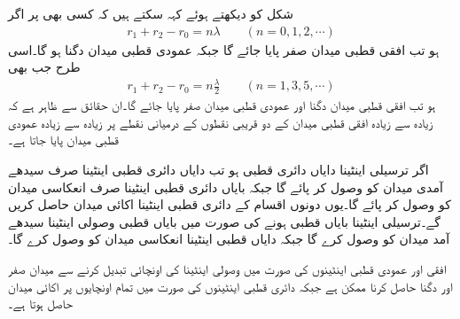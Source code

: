 شکل کو دیکھتے ہوئے کہہ سکتے ہیں کہ کسی بھی   پر اگر
\begin{align}
r_1+r_2-r_0=n\lambda \quad \quad (n=0,1,2,\cdots)
\end{align}
ہو تب افقی قطبی میدان صفر پایا جائے گا جبکہ عمودی قطبی میدان دگنا ہو گا۔اسی طرح جب بھی
\begin{align}
r_1+r_2-r_0=n \frac{\lambda}{2} \quad \quad (n=1,3,5,\cdots)
\end{align}
ہو تب افقی قطبی میدان دگنا اور عمودی قطبی میدان صفر پایا جائے گا۔ان حقائق سے ظاہر ہے کہ زیادہ سے زیادہ افقی قطبی میدان کے دو قریبی نقطوں کے درمیانی نقطے پر زیادہ سے زیادہ عمودی قطبی میدان پایا جاتا ہے۔

اگر ترسیلی اینٹینا دایاں دائری قطبی ہو تب دایاں دائری قطبی اینٹینا صرف سیدھے آمدی میدان کو وصول کر پائے گا جبکہ بایاں دائری قطبی اینٹینا صرف انعکاسی میدان کو وصول کر پائے گا۔یوں دونوں اقسام کے دائری قطبی اینٹینا اکائی میدان حاصل کریں گے۔ترسیلی اینٹینا بایاں قطبی ہونے کی صورت میں بایاں قطبی وصولی اینٹینا سیدھے آمد میدان کو وصول کرے گا جبکہ دایاں قطبی اینٹینا انعکاسی میدان کو وصول کرے گا۔

افقی اور عمودی قطبی اینٹینوں کی صورت میں وصولی اینٹینا کی اونچائی تبدیل کرنے سے میدان صفر اور دگنا حاصل کرنا ممکن ہے جبکہ دائری قطبی اینٹینوں کی صورت میں تمام اونچایوں پر اکائی میدان حاصل ہوتا ہے۔ 

 
